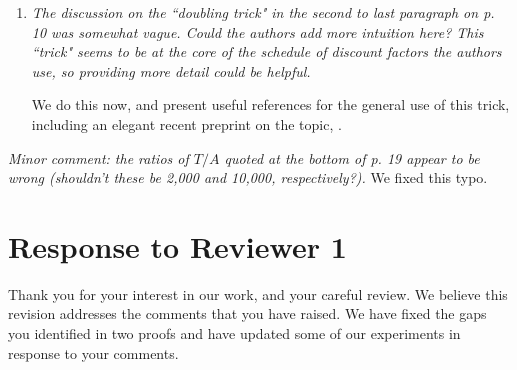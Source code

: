 \documentclass[11pt]{article}
\newcommand{\1}{\ensuremath{\mathbf{1}}} %
\theoremstyle{thm-sf}
\begin{document}
\begin{enumerate}
Thank you for this excellent suggestion. First, in the case of $OGI(1)$ special structure lets us solve for this index very quickly via Newton-Raphson (we discuss this in the manuscript). For $OGI(\infty)$ we rely on Gittins index approximation from the literature, including \cite{brezzi2002optimal, powell2012optimal}. For $OGI(k)$, implemented for the Beta-Bernoulli case, we relied on a relatively naive implementation that was sufficiently fast for our setup -- we believe this is primarily because the number of dynamic programs to solve for an index evaluation can be made quite small by heuristically guessing useful intervals for the index. We do believe that in general, the parametric LP you suggest is precisely the right tool. In the Beta-Bernoulli case, however, the state space considered at each time step is distinct (effectively, we consider the set of states that are reachable in $k$ steps from the current state), and this requires setting up new LPs at each time step; the overhead in doing this ends up being quite significant.
		
		
		\item {\it The discussion on the ``doubling trick" in the second to last paragraph on p. 10 was somewhat vague. Could the authors add more intuition here? This ``trick" seems to be at the core of the schedule of discount factors the authors use, so providing more detail could be helpful.}
		
We do this now, and present useful references for the general use of this trick, including an elegant recent preprint on the topic, \cite{besson2018doubling}. 
		

	\end{enumerate}
	
	{\it \noindent Minor comment: the ratios of $T/A$ quoted at the bottom of p. 19 appear to be wrong (shouldn't these be 2,000 and 10,000, respectively?).}
	\newline
	\newline
	We fixed this typo.
	
	\newpage
	\section{Response to  Reviewer 1}
	
	Thank you for your interest in our work, and your careful review. We believe this revision addresses the comments that you have raised. We have fixed the gaps you identified in two proofs and have updated some of our experiments in response to your comments.  
	
\end{document}

